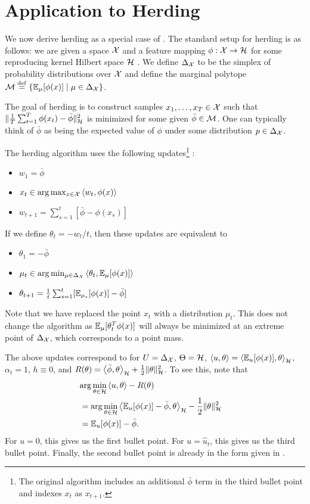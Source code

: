 \documentclass[paper.tex]{subfiles}
\begin{document}
\section{Application to Herding}
\label{sec:herding}

We now derive herding as a special case of \dual. The standard setup for herding is as follows: we are given a 
space $\mathcal{X}$ and a feature mapping $\phi : \mathcal{X} \to \mathcal{H}$ for some 
reproducing kernel Hilbert space $\mathcal{H}$ \cite{Hofmann:2008}. 
We define $\Delta_{\mathcal{X}}$ to be the simplex 
of probability distributions over $\mathcal{X}$ and define the marginal polytope 
$\mathcal{M} \stackrel{\mathrm{def}}{=} \{\mathbb{E}_{\mu}[\phi(x)] \mid \mu \in \Delta_{\mathcal{X}}\}$.

The goal of herding is to construct samples $x_1,\ldots,x_T \in \mathcal{X}$ 
such that $\|\frac{1}{T}\sum_{t=1}^T \phi(x_t)-\bar{\phi}\|_{\mathcal{H}}^2$ 
is minimized for some given $\bar{\phi} \in \mathcal{M}$. One can typically
think of $\bar \phi$ as being the expected value of $\phi$ under some 
distribution $p \in \Delta_{\mathcal{X}}$. 

The herding algorithm uses the following updates\footnote{The original 
algorithm includes an additional $\bar{\phi}$ term in the third bullet 
point and indexes $x_t$ as $x_{t+1}$.} \citep[][equations (1) and (2)]{Chen:2010a}:
\begin{itemize}
\item $w_1 = \bar{\phi}$
\item $x_t \in \arg\max_{x \in \mathcal{X}} \left\langle w_t, \phi(x) \right\rangle$
\item $w_{t+1} = \sum_{s=1}^t [\bar{\phi}-\phi(x_s)]$
\end{itemize}
If we define $\theta_t = -w_t/t$, then these updates are equivalent to
\begin{itemize}
\item $\theta_1 = -\bar{\phi}$
\item $\mu_t \in \arg\min_{\mu \in \Delta_{\mathcal{X}}} \left\langle \theta_t, \mathbb{E}_{\mu}[\phi(x)] \right\rangle$
\item $\theta_{t+1} = \frac{1}{t} \sum_{s=1}^t [\mathbb{E}_{\mu_s}[\phi(x)] - \bar{\phi}]$
\end{itemize}
Note that we have replaced the point $x_t$ with a distribution $\mu_t$. 
This does not change the algorithm as $\mathbb{E}_{\mu}[\theta_t^T\phi(x)]$ will 
always be minimized at an extreme point of $\Delta_{\mathcal{X}}$, which corresponds 
to a point mass.

The above updates correspond to \dual for $U = \Delta_{\mathcal{X}}$, $\Theta = \mathcal{H}$, 
$\left\langle u, \theta \right\rangle = \left\langle \mathbb{E}_u[\phi(x)], \theta \right\rangle_{\mathcal{H}}$, $\alpha_t = 1$, $h \equiv 0$, and
$R(\theta) = \left\langle \bar{\phi}, \theta \right\rangle_{\mathcal{H}} + \frac{1}{2}\|\theta\|_{\mathcal{H}}^2$.
To see this, note that 
\begin{align}
\lefteqn{\arg\min_{\theta \in \sH} \ip{u}{\theta} - R(\theta)} \\
 &= \arg\min_{\theta \in \sH} \ip{\bE_{u}[\phi(x)]-\bar{\phi}}{\theta}_{\sH} - \frac{1}{2}\|\theta\|_{\sH}^2 \\
 &= \bE_u[\phi(x)] - \bar{\phi}.
\end{align}
For $u = 0$, this gives us the first bullet point. For $u = \hat{u}_t$, 
this gives us the third bullet point. Finally, the second bullet point 
is already in the form given in \dual.
\end{document}

